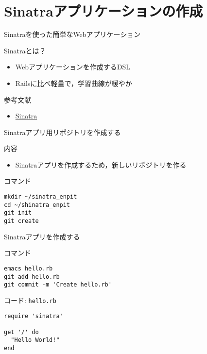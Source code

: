 \documentclass[t, aspectratio=169]{beamer}
\begin{document}
\section{Sinatraアプリケーションの作成}
\label{sec-5-1}
\begin{frame}[label=sec-5-1-1]{Sinatraを使った簡単なWebアプリケーション}
\begin{block}{Sinatraとは？}
\begin{itemize}
\item Webアプリケーションを作成するDSL
\item Railsに比べ軽量で，学習曲線が緩やか
\end{itemize}
\end{block}

\begin{block}{参考文献}
\begin{itemize}
\item \href{http://www.sinatrarb.com/}{Sinatra}
\end{itemize}
\end{block}
\end{frame}
\begin{frame}[fragile,label=sec-5-1-2]{Sinatraアプリ用リポジトリを作成する}
 \begin{block}{内容}
\begin{itemize}
\item Sinatraアプリを作成するため，新しいリポジトリを作る
\end{itemize}
\end{block}

\begin{block}{コマンド}
\begin{verbatim}
mkdir ~/sinatra_enpit
cd ~/shinatra_enpit
git init
git create
\end{verbatim}
\end{block}
\end{frame}
\begin{frame}[fragile,label=sec-5-1-3]{Sinatraアプリを作成する}
 \begin{block}{コマンド}
\begin{verbatim}
emacs hello.rb
git add hello.rb
git commit -m 'Create hello.rb'
\end{verbatim}
\end{block}
\begin{block}{コード: \texttt{hello.rb}}
\begin{verbatim}
require 'sinatra'

get '/' do
  "Hello World!"
end
\end{verbatim}
\end{block}
\end{frame}
\end{document}
